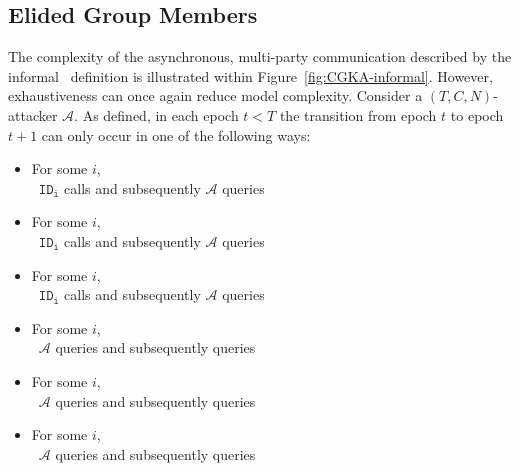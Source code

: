 \hypertarget{sec:elided-group-members}{%
\subsection{Elided Group Members}\label{sec:elided-group-members}}

The complexity of the asynchronous, multi-party communication described by the informal \CGKAsec\ definition is illustrated within Figure\ \ref{fig:CGKA-informal}.
However, exhaustiveness can once again reduce model complexity.
Consider a \((T, C, N)\)-attacker \(\mathcal{A}\).
As defined, in each epoch $t < T$ the transition from epoch $t$ to epoch $t+1$ can only occur in one of the following ways:

\begin{itemize}
  \item For some \(i\),\\~\hspace{4em}\(\mathtt{ID_i}\) calls  and subsequently \(\mathcal{A}\) queries 
  \item For some \(i\),\\~\hspace{4em}\(\mathtt{ID_i}\) calls  and subsequently \(\mathcal{A}\) queries 
  \item For some \(i\),\\~\hspace{4em}\(\mathtt{ID_i}\) calls  and subsequently \(\mathcal{A}\) queries 
  \item For some \(i\),\\~\hspace{4em}\(\mathcal{A}\) queries     and subsequently queries 
  \item For some \(i\),\\~\hspace{4em}\(\mathcal{A}\) queries  and subsequently queries 
  \item For some \(i\),\\~\hspace{4em}\(\mathcal{A}\) queries  and subsequently queries 
\end{itemize}

